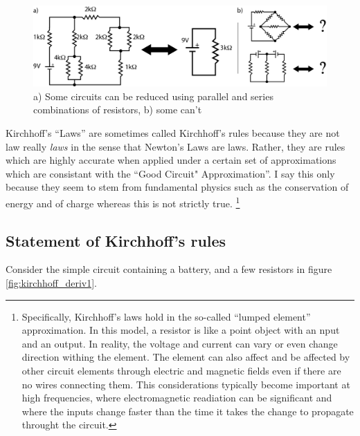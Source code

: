 \documentclass{tufte-book}
\begin{document}
\begin{figure}[h]
\caption{a) Some circuits can be reduced using parallel and series combinations of resistors, b) some can't}
\label{fig:kirchhoff_circuits}
\begin{center}
\includegraphics{kirchhoff_circuits.png}
\end{center}
\end{figure}


Kirchhoff's ``Laws'' are sometimes called Kirchhoff's rules because they are not law really \textit{laws} in the sense that Newton's Laws are laws. Rather, they are rules which are highly accurate when applied under a certain set of approximations which are consistant with the ``Good Circuit" Approximation''. I say this only because they seem to stem from fundamental physics such as the conservation of energy and of charge whereas this is not strictly true. \footnote{Specifically, Kirchhoff's laws hold in the so-called ``lumped element'' approximation. In this model, a resistor is like a point object with an nput and an output. In reality, the voltage and current can vary or even change direction withing the element. The element can also affect and be affected by other circuit elements through electric and magnetic fields even if there are no wires connecting them. This considerations typically become important at high frequencies, where electromagnetic readiation can be significant and where the inputs change faster than the time it takes the change to propagate throught the circuit.}

\subsection{Statement of Kirchhoff's rules}
Consider the simple circuit containing a battery, and a few resistors in figure \ref{fig:kirchhoff_deriv1}. 
\end{document}
